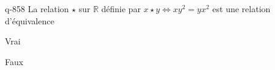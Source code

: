\begin{truefalse}{q-858}
La relation $\star$ sur $\mathbb R$ définie par $x\star y \iff xy^2=yx^2$ est une relation d'équivalence
\item* Vrai
\item Faux
\end{truefalse}

